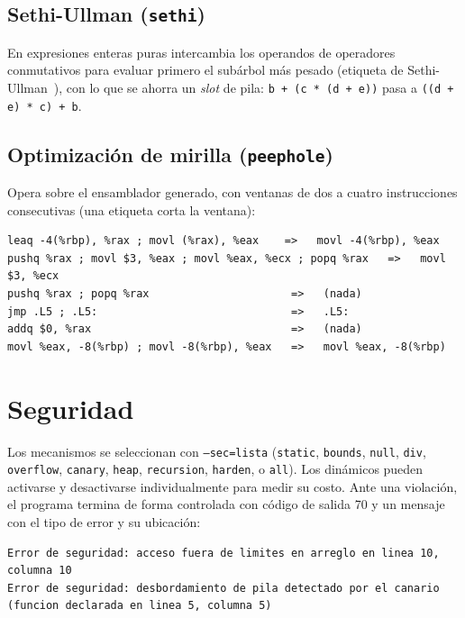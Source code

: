 \documentclass[11pt,a4paper]{article}
\newcommand{\cod}[1]{\texttt{#1}}
\begin{document}
\subsection{Sethi-Ullman (\cod{sethi})}
En expresiones enteras puras intercambia los operandos de operadores conmutativos para evaluar primero el
subárbol más pesado (etiqueta de Sethi-Ullman~\cite{sethi70}), con lo que se ahorra un \emph{slot} de pila:
\cod{b + (c * (d + e))} pasa a \cod{((d + e) * c) + b}.

\subsection{Optimización de mirilla (\cod{peephole})}
Opera sobre el ensamblador generado, con ventanas de dos a cuatro instrucciones consecutivas (una etiqueta corta la ventana):
\begin{lstlisting}
leaq -4(%rbp), %rax ; movl (%rax), %eax    =>   movl -4(%rbp), %eax
pushq %rax ; movl $3, %eax ; movl %eax, %ecx ; popq %rax   =>   movl $3, %ecx
pushq %rax ; popq %rax                      =>   (nada)
jmp .L5 ; .L5:                              =>   .L5:
addq $0, %rax                               =>   (nada)
movl %eax, -8(%rbp) ; movl -8(%rbp), %eax   =>   movl %eax, -8(%rbp)
\end{lstlisting}

\section{Seguridad}
\label{sec:seg}
Los mecanismos se seleccionan con \cod{--sec=lista} (\cod{static}, \cod{bounds}, \cod{null}, \cod{div},
\cod{overflow}, \cod{canary}, \cod{heap}, \cod{recursion}, \cod{harden}, o \cod{all}). Los dinámicos pueden
activarse y desactivarse individualmente para medir su costo. Ante una violación, el programa termina de forma
controlada con código de salida 70 y un mensaje con el tipo de error y su ubicación:
\begin{lstlisting}
Error de seguridad: acceso fuera de limites en arreglo en linea 10, columna 10
Error de seguridad: desbordamiento de pila detectado por el canario (funcion declarada en linea 5, columna 5)
\end{lstlisting}
\end{document}
